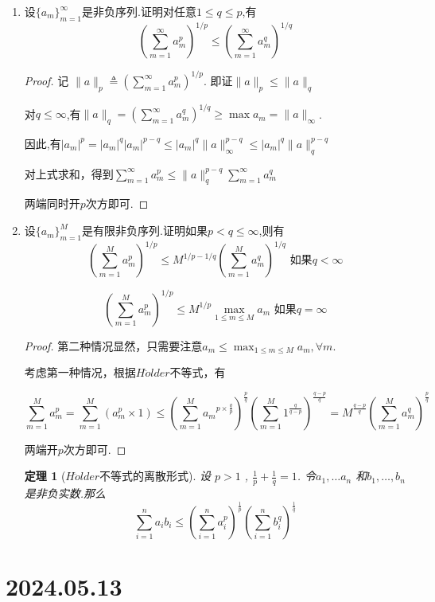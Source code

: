 \documentclass[12pt,a4paper]{article}
\newtheorem{theorem}{定理}
\begin{document}
	\begin{enumerate}
		\item 设$\{a_m\}_{m=1}^\infty$是非负序列.证明对任意$1\leq q\leq p$,有
		$$(\sum_{m=1}^\infty a_m^p)^{1/p}\leq(\sum_{m=1}^\infty a_m^q)^{1/q}$$
		
		\begin{proof}
			记 $\|a\|_p\triangleq (\sum_{m=1}^\infty a_m^p)^{1/p}$. 即证$\|a\|_p \leq \|a\|_q$
			
			对$q \leq \infty$,有$\|a\|_q = (\sum_{m=1}^\infty a_m^q)^{1/q} \geq \max a_m = \|a\|_\infty$.
			
			因此,有$|a_m|^p=|a_m|^q|a_m|^{p-q}\leq|a_m|^q  \|a\|_\infty^{p-q} \leq|a_m|^q\|a\|_q^{p-q}$
			
			对上式求和，得到$\sum_{m=1}^\infty a_m^p \leq \|a\|_q^{p-q} \sum_{m=1}^\infty a_m^q$
			
			两端同时开$p$次方即可.
		\end{proof}
		\item 设$\{a_m\}_{m=1}^M$是有限非负序列.证明如果$p<q\leq\infty$,则有
		$$(\sum_{m=1}^Ma_m^p)^{1/p}\leq M^{1/p-1/q}(\sum_{m=1}^Ma_m^q)^{1/q}\text{ 如果}q<\infty$$
		
		$$(\sum_{m=1}^Ma_m^p)^{1/p}\leq M^{1/p}\max_{1\leq m\leq M}a_m\text{ 如果}q=\infty $$
		
		\begin{proof}
			第二种情况显然，只需要注意$a_m \leq \max_{1\leq m\leq M}a_m, \forall m$.
			
			考虑第一种情况，根据$H\ddot{o}lder$不等式，有
			
			$$\sum_{m=1}^M a_m^p = \sum_{m=1}^M (a_m^p \times 1) \leq \left(\sum_{m=1}^M {a_m}^{p\times \frac{q}{p}}\right)^\frac{p}{q} \left(\sum_{m=1}^M 1^{\frac{q}{q-p}}\right)^{\frac{q-p}{q}}=M^{\frac{q-p}{q}} \left(\sum_{m=1}^M a_m^{q}\right)^\frac{p}{q}$$
			
			两端开$p$次方即可.
		\end{proof}
		
		\begin{theorem}[$H\ddot{o}lder$不等式的离散形式]
			设 $p>1$ , $\frac{1}{p}+\frac{1}{q}=1$. 令$a_1,\ldots a_n$ 和$b_1,\ldots,b_n$ 是非负实数.那么
			$$\sum_{i=1}^na_ib_i\leq\left(\sum_{i=1}^na_i^p\right)^{\frac1p}\left(\sum_{i=1}^nb_i^q\right)^{\frac1q}$$
		\end{theorem}
	\end{enumerate}
	
	\newpage
	
		\section*{2024.05.13}	
	
\end{document}
